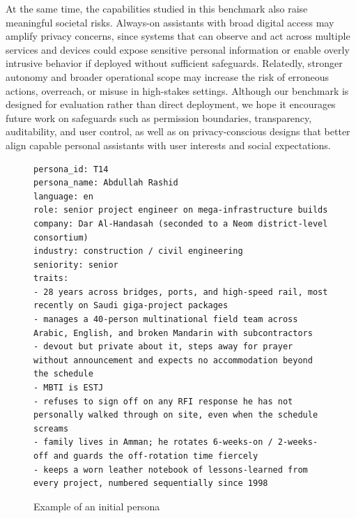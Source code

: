 \documentclass{article}
\begin{document}
At the same time, the capabilities studied in this benchmark also raise meaningful societal risks. Always-on assistants with broad digital access may amplify privacy concerns, since systems that can observe and act across multiple services and devices could expose sensitive personal information or enable overly intrusive behavior if deployed without sufficient safeguards. Relatedly, stronger autonomy and broader operational scope may increase the risk of erroneous actions, overreach, or misuse in high-stakes settings. Although our benchmark is designed for evaluation rather than direct deployment, we hope it encourages future work on safeguards such as permission boundaries, transparency, auditability, and user control, as well as on privacy-conscious designs that better align capable personal assistants with user interests and social expectations.

\begin{figure}[htbp]
\centering
\begin{tcolorbox}[
    colback=white,           
    colframe=black!60,         
    coltitle=white,         
    colbacktitle=black!60,
    title=Persona,    
    fonttitle=\bfseries,      
    boxrule=0.7pt,             
    arc=1mm,                   
    width=1\linewidth,      
]
\begin{lstlisting}[basicstyle=\footnotesize\ttfamily, breaklines=true]
persona_id: T14
persona_name: Abdullah Rashid
language: en
role: senior project engineer on mega-infrastructure builds
company: Dar Al-Handasah (seconded to a Neom district-level consortium)
industry: construction / civil engineering
seniority: senior
traits:
- 28 years across bridges, ports, and high-speed rail, most recently on Saudi giga-project packages
- manages a 40-person multinational field team across Arabic, English, and broken Mandarin with subcontractors
- devout but private about it, steps away for prayer without announcement and expects no accommodation beyond the schedule
- MBTI is ESTJ
- refuses to sign off on any RFI response he has not personally walked through on site, even when the schedule screams
- family lives in Amman; he rotates 6-weeks-on / 2-weeks-off and guards the off-rotation time fiercely
- keeps a worn leather notebook of lessons-learned from every project, numbered sequentially since 1998

\end{lstlisting}

\end{tcolorbox}
\caption{Example of an initial persona}
\label{fig:PersonaDemo}
\end{figure}
\end{document}
